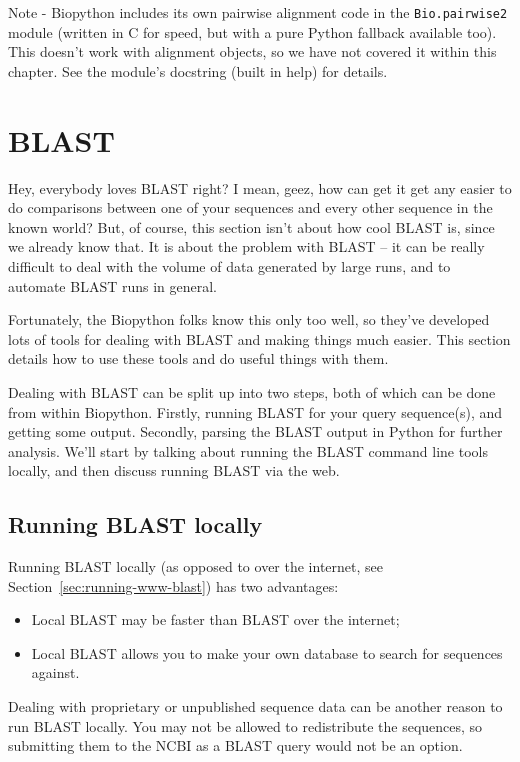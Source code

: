 \documentclass{report}
\begin{document}
Note - Biopython includes its own pairwise alignment code in the \verb|Bio.pairwise2|
module (written in C for speed, but with a pure Python fallback available too). This
doesn't work with alignment objects, so we have not covered it within this chapter.
See the module's docstring (built in help) for details.


\chapter{BLAST}
\label{chapter:blast}
Hey, everybody loves BLAST right? I mean, geez, how can get it get any easier to do comparisons between one of your sequences and every other sequence in the known world? But, of course, this section isn't about how cool BLAST is, since we already know that. It is about the problem with BLAST -- it can be really difficult to deal with the volume of data generated by large runs, and to automate BLAST runs in general.

Fortunately, the Biopython folks know this only too well, so they've developed lots of tools for dealing with BLAST and making things much easier. This section details how to use these tools and do useful things with them.

Dealing with BLAST can be split up into two steps, both of which can be done from within Biopython.
Firstly, running BLAST for your query sequence(s), and getting some output.
Secondly, parsing the BLAST output in Python for further analysis.
We'll start by talking about running the BLAST command line tools locally, and then discuss running BLAST via the web.

\section{Running BLAST locally}
\label{sec:running-local-blast}

Running BLAST locally (as opposed to over the internet, see
Section~\ref{sec:running-www-blast}) has two advantages:
\begin{itemize}
\item Local BLAST may be faster than BLAST over the internet;
\item Local BLAST allows you to make your own database to search for sequences against.
\end{itemize}
Dealing with proprietary or unpublished sequence data can be another reason to run BLAST locally.  You may not be allowed to redistribute the sequences, so submitting them to the NCBI as a BLAST query would not be an option.
\end{document}
